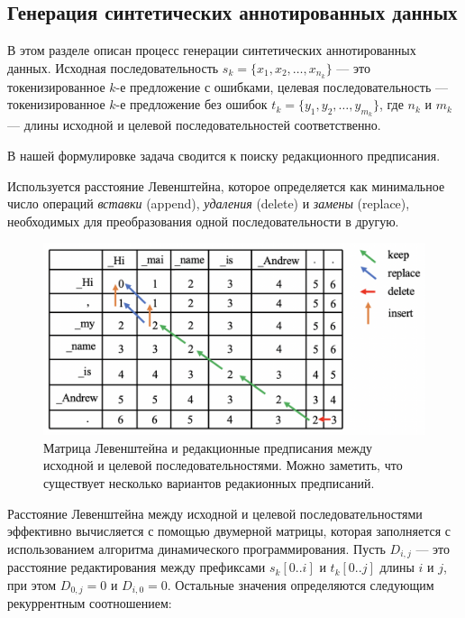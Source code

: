 \subsection{Генерация синтетических аннотированных данных}

В этом разделе описан процесс генерации синтетических аннотированных данных. Исходная последовательность $s_k = \{x_1, x_2, \ldots, x_{n_k}\}$ — это токенизированное $k$-е предложение с ошибками, целевая последовательность — токенизированное $k$-е предложение без ошибок $t_k = \{y_1, y_2, \ldots, y_{m_k}\}$, где $n_k$ и $m_k$ — длины исходной и целевой последовательностей соответственно.

В нашей формулировке задача сводится к поиску редакционного предписания.

Используется расстояние Левенштейна, которое определяется как минимальное число операций \textit{вставки} (append), \textit{удаления} (delete) и \textit{замены} (replace), необходимых для преобразования одной последовательности в другую.

\begin{figure}[h]
  \centering
  \includegraphics[width=\linewidth]{images/backtracking.png}
  \caption{Матрица Левенштейна и редакционные предписания между исходной и целевой последовательностями. Можно заметить, что существует несколько вариантов редакионных предписаний.}
  \label{fig:backtracking}
\end{figure}

Расстояние Левенштейна между исходной и целевой последовательностями эффективно вычисляется с помощью двумерной матрицы, которая заполняется с использованием алгоритма динамического программирования. Пусть $D_{i,j}$ — это расстояние редактирования между префиксами $s_k[0..i]$ и $t_k[0..j]$ длины $i$ и $j$, при этом $D_{0,j} = 0$ и $D_{i,0} = 0$. Остальные значения определяются следующим рекуррентным соотношением:

